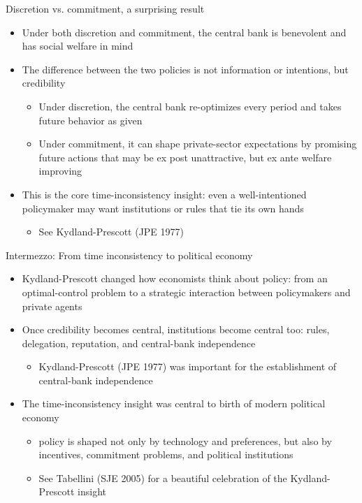 \documentclass[9pt,xcolor={dvipsnames}]{beamer}
\newcommand{\bit}{\begin{itemize}}
\newcommand{\eit}{\end{itemize}}
\newcommand{\bc}{\color{blue}}
\begin{document}
\begin{frame}{Discretion vs. commitment, a surprising result}

\bit
\setlength\itemsep{1.5em}

\item Under both discretion and commitment, the central bank is benevolent and has social welfare in mind

\item The difference between the two policies is {\bc not} information or intentions, but {\bc credibility}
\bit
\setlength\itemsep{0.5em}
\item Under discretion, the central bank re-optimizes every period and takes future behavior as given

\item Under commitment, it can shape private-sector expectations by promising future actions that may be ex post unattractive, but ex ante welfare improving
\eit

\item This is the core time-inconsistency insight: even a well-intentioned policymaker may want institutions or rules that tie its own hands
\bit
\setlength\itemsep{0.5em}
	\item See Kydland-Prescott (JPE 1977) 
\eit

\eit

\end{frame}


\begin{frame}{Intermezzo: From time inconsistency to political economy}

\bit
\setlength\itemsep{1.5em}

\item Kydland-Prescott changed how economists think about policy: from an optimal-control problem to a {\bc strategic interaction} between policymakers and private agents

\item Once credibility becomes central, institutions become central too: rules, delegation, reputation, and central-bank independence
\bit
	\item Kydland-Prescott (JPE 1977) was important for the establishment of central-bank independence
\eit

\item The time-inconsistency insight was central to birth of modern {\bc political economy}
\bit
\setlength\itemsep{0.5em}
\item policy is shaped not only by technology and preferences, but also by incentives, commitment problems, and political institutions

\item See Tabellini (SJE 2005) for a beautiful celebration of the Kydland-Prescott insight
\eit
\eit

\end{frame}
\end{document}
